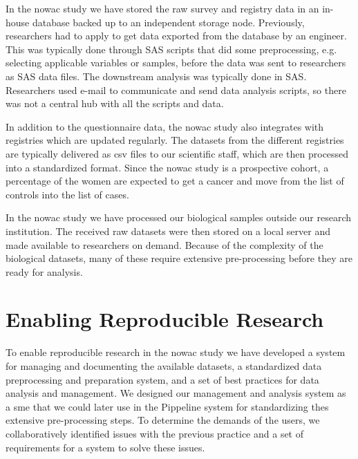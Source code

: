 In the \gls{nowac} study we have stored the raw survey and registry data in an
in-house database backed up to an independent storage node. Previously,
researchers had to apply to get data exported from the database by an engineer.
This was typically done through SAS scripts that did some preprocessing, e.g.
selecting applicable variables or samples, before the data was sent to
researchers as SAS data files. The downstream analysis was typically done in
SAS. Researchers used e-mail to communicate and send data analysis scripts, so
there was not a central hub with all the scripts and data. 

In addition to the questionnaire data, the \gls{nowac} study also integrates
with registries which are updated regularly. The datasets from the different
registries are typically delivered as \gls{csv} files to our scientific staff,
which are then processed into a standardized format. Since the \gls{nowac} study
is a prospective cohort, a percentage of the women are expected to get a cancer
and move from the list of controls into the list of cases. 

In the \gls{nowac} study we have processed our biological samples outside our
research institution. The received raw datasets were then stored on a
local server and made available to researchers on demand. Because of the
complexity of the biological datasets, many of these require extensive
pre-processing before they are ready for analysis. 


\section{Enabling Reproducible Research} 
To enable reproducible research in the \gls{nowac} study we have developed a
system for managing and documenting the available datasets, a standardized data
preprocessing and preparation system, and a set of best practices for data
analysis and management. We designed our management and analysis system as a
\gls{sme} that we could later use in the Pippeline system for standardizing
thes extensive pre-processing steps. To determine the
demands of the users, we collaboratively identified issues with the previous
practice and a set of requirements for a system to solve these issues.

